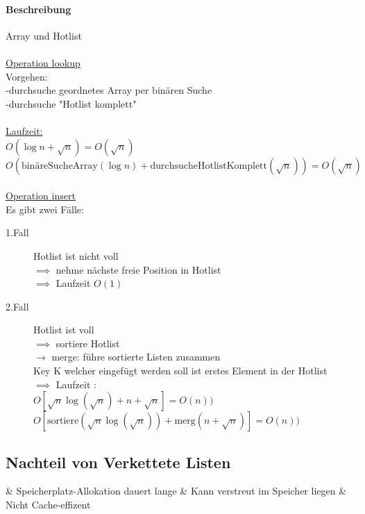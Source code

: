 \documentclass[a4paper]{scrartcl}
\begin{document}
			\paragraph{Beschreibung}
			Array und Hotlist\\
			\\
			\uline{Operation lookup}\\
			Vorgehen:\\
			-durchsuche geordnetes Array per binären Suche\\
			-durchsuche "Hotlist komplett"\\
			\\
			\ul{Laufzeit:}\\
			\(O(\log n + \sqrt{n}) = O(\sqrt{n})\)\\
			\(O(\text{binäreSucheArray}(\log n ) + \text{durchsucheHotlistKomplett}(\sqrt{n}) ) = O(\sqrt{n})\)\\
			\\
			\ul{Operation insert}\\
			Es gibt zwei Fälle:\\
			\begin{description}
				\item[1.Fall] Hotlist ist nicht voll \\ \( \implies \) nehme nächste freie Position in Hotlist \\ \( \implies \) Laufzeit \(O(1)\)
				\item[2.Fall] Hotlist ist voll \\ \( \implies \) sortiere Hotlist \\ \( \rightarrow \) merge: führe sortierte Listen zusammen\\ Key K welcher eingefügt werden soll ist erstes Element in der Hotlist\\ \( \implies\) Laufzeit : \\ \(O[\sqrt{n} \log (\sqrt{n}) + n + \sqrt{n}] = O(n) ) \)\\
				\(O[\text{sortiere}(\sqrt{n} \log (\sqrt{n}) )+ \text{merg}(n + \sqrt{n})] = O(n) ) \)\\
			\end{description}
		
		\subsection{Nachteil von Verkettete Listen}
			\begin{easylist}
			& Speicherplatz-Allokation dauert lange
			& Kann verstreut im Speicher liegen
			& Nicht Cache-effizent
		\end{easylist}
	
\end{document}
